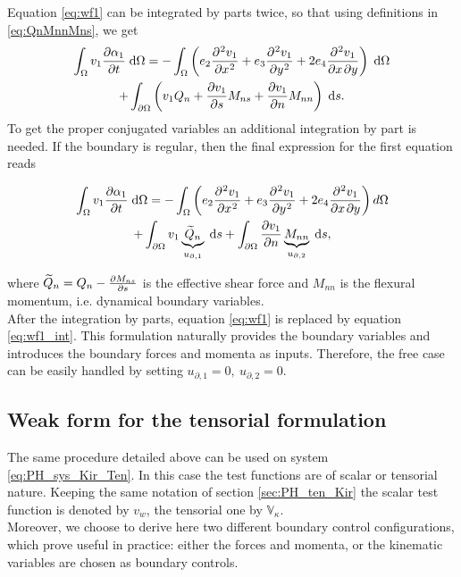 \documentclass[preprint,12pt]{elsarticle}
\begin{document}
	Equation \eqref{eq:wf1} can be integrated by parts twice, so that using definitions in \eqref{eq:QnMnnMns}, we get
	\begin{multline}
	\int_{\Omega} v_1 \diffp{\alpha_1}{t} \d\Omega = - \int_{\Omega} \left(e_2 \diffp[2]{v_1}{x} + e_3 \diffp[2]{v_1}{y} + 2 e_4 \diffp{v_1}{x,y} \right) \d\Omega \\
	+ \int_{\partial \Omega} \left( v_1 Q_n + \diffp{v_1}{s} M_{ns} + \diffp{v_1}{n} M_{nn}  \right) \d{s}.
	\end{multline}
	To get the proper conjugated variables an additional integration by part is needed. If the boundary is regular, then the final expression for the first equation reads
	
	\begin{multline}
	\label{eq:wf1_int}
	\int_{\Omega} v_1 \diffp{\alpha_1}{t} \d\Omega = - \int_{\Omega} \left(e_2 \diffp[2]{v_1}{x} + e_3 \diffp[2]{v_1}{y} + 2 e_4 \diffp{v_1}{x,y} \right) d\Omega \\
	+\int_{\partial \Omega} v_1 \underbrace{\widetilde{Q}_n}_{u_{\partial, 1} } \d{s} +\int_{\partial \Omega} \diffp{v_1}{n} \underbrace{M_{nn}}_{u_{\partial, 2} } \d{s},
	\end{multline}
	
	where $\widetilde{Q}_n = Q_n - \diffp{M_{ns}}{s}$ is the effective shear force and $M_{nn}$ is the flexural momentum, i.e. dynamical boundary variables. \\
	After the integration by parts, equation \eqref{eq:wf1} is replaced by equation \eqref{eq:wf1_int}. This formulation naturally provides  the boundary variables and introduces the boundary forces and momenta as inputs. Therefore, the free case can be easily handled by setting $u_{\partial, 1}=0, \ u_{\partial, 2} = 0$.
	 
	\subsection{Weak form for the tensorial formulation}
	The same procedure detailed above can be used on system \eqref{eq:PH_sys_Kir_Ten}. In this case the test functions are of scalar or tensorial nature. Keeping the same notation of section \ref{sec:PH_ten_Kir} the scalar test function is denoted by $v_w$, the tensorial one by $\mathbb{V}_{\kappa}$. \\
	Moreover, we choose to derive here two different boundary control configurations, which prove useful in practice: either the forces and momenta, or the kinematic variables are chosen as boundary controls.
	
\end{document}
